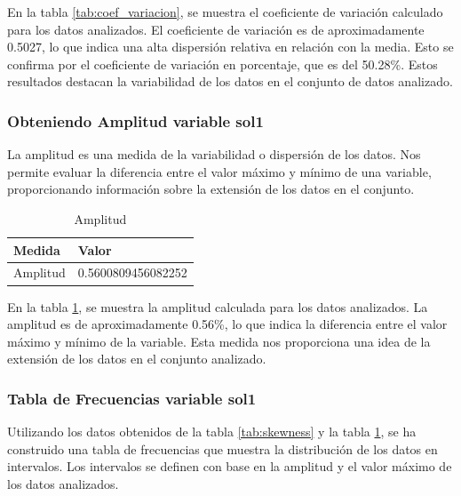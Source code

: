 En la tabla \ref{tab:coef_variacion}, se muestra el coeficiente de variación calculado para los datos analizados. El coeficiente de variación es de aproximadamente 0.5027, lo que indica una alta dispersión relativa en relación con la media. Esto se confirma por el coeficiente de variación en porcentaje, que es del 50.28\%. Estos resultados destacan la variabilidad de los datos en el conjunto de datos analizado.

\subsubsection{Obteniendo Amplitud variable sol1}

La amplitud es una medida de la variabilidad o dispersión de los datos. Nos permite evaluar la diferencia entre el valor máximo y mínimo de una variable, proporcionando información sobre la extensión de los datos en el conjunto.

\begin{table}[H]
    \centering
    \caption{Amplitud}
    \begin{tabular}{ll}
        \hline
        \textbf{Medida} & \textbf{Valor}     \\
        \hline
        Amplitud        & 0.5600809456082252 \\
        \hline
    \end{tabular}%
    \label{tab:amplitud}%
\end{table}%

En la tabla \ref{tab:amplitud}, se muestra la amplitud calculada para los datos analizados. La amplitud es de aproximadamente 0.56\%, lo que indica la diferencia entre el valor máximo y mínimo de la variable. Esta medida nos proporciona una idea de la extensión de los datos en el conjunto analizado.

\subsubsection{Tabla de Frecuencias variable sol1}

Utilizando los datos obtenidos de la tabla \ref{tab:skewness} y la tabla \ref{tab:amplitud}, se ha construido una tabla de frecuencias que muestra la distribución de los datos en intervalos. Los intervalos se definen con base en
la amplitud y el valor máximo de los datos analizados.

